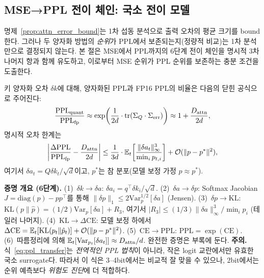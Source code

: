 \subsection{MSE→PPL 전이 체인: 국소 전이 모델}
\label{sec:mse_ppl_chain}

명제~\ref{prop:attn_error_bound}는 1차 섭동 분석으로 출력 오차의 평균 크기를 bound한다. 그러나 두 양자화 방법의 \emph{순위}가 PPL에서 보존되는지(정량적 비교)는 1차 분석만으로 결정되지 않는다. 본 절은 MSE에서 PPL까지의 6단계 전이 체인을 명시적 3차 나머지 항과 함께 유도하고, 이로부터 MSE 순위가 PPL 순위를 보존하는 충분 조건을 도출한다.

\begin{proposition}
\label{prop:mse_ppl_transfer}
키 양자화 오차 $\delta k$에 대해, 양자화된 PPL과 FP16 PPL의 비율은 다음의 닫힌 공식으로 주어진다:
\begin{equation}
\frac{\mathrm{PPL}_{\mathrm{quant}}}{\mathrm{PPL}_{\mathrm{fp}}} \approx \exp\!\left(\frac{1}{2d} \cdot \mathrm{tr}(\Sigma_Q \cdot \Sigma_{\mathrm{err}})\right) \approx 1 + \frac{D_{\mathrm{attn}}}{2d},
\label{eq:ppl_transfer}
\end{equation}
명시적 오차 한계는
\begin{equation}
\left|\frac{\Delta \mathrm{PPL}}{\mathrm{PPL}_{\mathrm{fp}}} - \frac{D_{\mathrm{attn}}}{2d}\right| \leq \frac{1}{3d} \cdot \mathbb{E}_t\!\left[\frac{\lVert \delta a_t \rVert_\infty^3}{\min_i p_{t,i}}\right] + \mathcal{O}(\lVert p - p^* \rVert^2),
\label{eq:ppl_error_bound}
\end{equation}
여기서 $\delta a_t = Q \delta k_t / \sqrt{d}$이고, $p^*$는 참 분포(모델 보정 가정 $p \approx p^*$).
\end{proposition}

\begin{theorycomment}
\textbf{증명 개요 (6단계).}
(1)~$\delta k \to \delta a$: $\delta a_i = q^\top \delta k_i / \sqrt{d}$.
(2)~$\delta a \to \delta p$: Softmax Jacobian $J = \mathrm{diag}(p) - pp^\top$를 통해 $\lVert \delta p \rVert_1 \leq 2 \mathrm{Var}_p^{1/2}[\delta a]$ (Jensen).
(3)~$\delta p \to \mathrm{KL}$: $\mathrm{KL}(p \| \hat{p}) = (1/2) \mathrm{Var}_p[\delta a] + R_3$, 여기서 $|R_3| \leq (1/3) \lVert \delta a \rVert_\infty^3 / \min_i p_i$ (테일러 나머지).
(4)~$\mathrm{KL} \to \Delta \mathrm{CE}$: 모델 보정 하에서 $\Delta \mathrm{CE} = \mathbb{E}_t[\mathrm{KL}(p_t \| \hat{p}_t)] + \mathcal{O}(\lVert p - p^* \rVert^2)$.
(5)~$\mathrm{CE} \to \mathrm{PPL}$: $\mathrm{PPL} = \exp(\mathrm{CE})$.
(6)~따름정리에 의해 $\mathbb{E}_t[\mathrm{Var}_{p_t}[\delta a_t]] \approx D_{\mathrm{attn}}/d$. 완전한 증명은 부록에 둔다.
\textbf{주의.} 식~\eqref{eq:ppl_transfer}는 \emph{전역적인 PPL 법칙}이 아니라, 작은 logit 교란에서만 유효한 국소 surrogate다. 따라서 이 식은 3--4bit에서는 비교적 잘 맞을 수 있으나, 2bit에서는 순위 예측보다 \emph{위험도 진단}에 더 적합하다.
\end{theorycomment}

